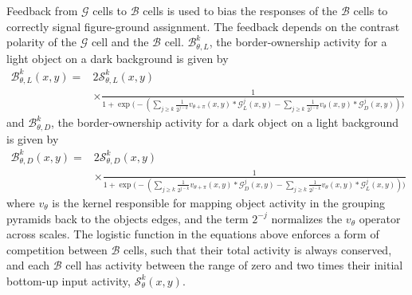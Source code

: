 \documentclass[12pt]{article}
\begin{document}
%
Feedback from $\mathcal{G}$ cells to $\mathcal{B}$ cells is used to bias the responses of the $\mathcal{B}$ cells to correctly signal figure-ground assignment. The feedback depends on the contrast polarity of the $\mathcal{G}$ cell and the $\mathcal{B}$ cell.
 $\mathcal{B}^k_{\theta,L}$, the border-ownership activity for a light object on a dark background is given by
 \begin{equation}
 \begin{split}
\mathcal{B}^k_{\theta,L}(x,y) = &2\mathcal{S}^k_{\theta,L}(x,y)\\
            &\times\frac{1}{1+\exp\Big(-(\sum_{j\geq k}\frac{1}{2^{j-k}} v_{\theta+\pi}(x,y) \ast \mathcal{G}^j_{L}(x,y)-\sum_{j\geq k}\frac{1}{2^{j-k}} v_{\theta}(x,y) \ast \mathcal{G}^j_{D}(x,y))\Big)}
\end{split}
\label{eq:border-orientation1}
\end{equation}
and $\mathcal{B}^k_{\theta,D}$, the border-ownership activity for a dark object on a light background is given by
 \begin{equation}
 \begin{split}
\mathcal{B}^k_{\theta,D}(x,y) = &2\mathcal{S}^k_{\theta,D}(x,y)\\
            &\times\frac{1}{1+\exp\Big(-(\sum_{j\geq k}\frac{1}{2^{j-k}} v_{\theta+\pi}(x,y) \ast \mathcal{G}^j_{D}(x,y)-\sum_{j\geq k}\frac{1}{2^{j-k}} v_{\theta}(x,y) \ast \mathcal{G}^j_{L}(x,y))\Big)}
\end{split}
\label{eq:border-orientation2}
\end{equation}
where $v_{\theta}$ is the kernel responsible for mapping object activity in the grouping pyramids back to the objects edges, and the term $2^{-j}$ normalizes the $v_{\theta}$ operator across scales. The logistic function in the equations above enforces a form of competition between
$\mathcal{B}$
cells, such that their total activity is always conserved, and each
$\mathcal{B}$
cell has activity between the range of zero and two times their initial bottom-up input activity, $\mathcal{S}^k_{\theta}(x,y)$.
%
\end{document}
